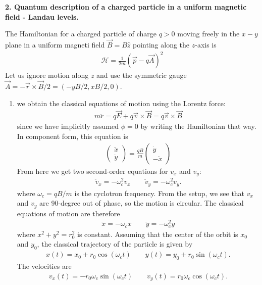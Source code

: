 \documentclass{article}
\theoremstyle{definition}
\newcommand{\ham}{\mathcal{H}}
\newcommand{\f}[2]{\frac{#1}{#2}}
\newcommand{\lp}{\left(}
\newcommand{\rp}{\right)}
\begin{document}
\noindent \textbf{2. Quantum description of a charged particle in a uniform magnetic field - Landau levels.}

\noindent The Hamiltonian for a charged particle of charge $q>0$ moving freely in the $x-y$ plane in a uniform magneti field $\vec{B} = B\hat{z}$ pointing along the $z$-axis is
\begin{align*}
	\ham = \f{1}{2m}\lp \vec{p} - q\vec{A} \rp^2
\end{align*}
Let us ignore motion along $z$ and use the symmetric gauge $\vec{A} = -\vec{r}\times \vec{B}/2 = (-yB/2, xB/2,0)$. 

\begin{enumerate}[label=\alph*)]
	
	\item we obtain the classical equations of motion using the Lorentz force:
	\begin{align*}
		m\ddot{r} = q\vec{E} + q \vec{v}\times \vec{B} = q \vec{v} \times \vec{B}
	\end{align*}
	since we have implicitly assumed $\phi = 0$ by writing the Hamiltonian that way. In component form, this equation is 
	\begin{align*}
		\begin{pmatrix}
			\ddot{x} \\ \ddot{y}
		\end{pmatrix}
	= \f{qB}{m}\begin{pmatrix}
		\dot{y} \\ -\dot{x}  
	\end{pmatrix} 
	\end{align*}
	From here we get two second-order equations for $v_x$ and $v_y$: 
	\begin{align*}
		\ddot{v}_x = -\omega_c^2 v_x \quad\quad \ddot{v}_y = -\omega_c^2 v_y.
	\end{align*}
	where $\omega_c = qB/m$ is the cyclotron frequency. From the setup, we see that $v_x$ and $v_y$ are 90-degree out of phase, so the motion is circular. The classical equations of motion are therefore
	\begin{align*}
		\ddot{x} = -\omega_c x \quad\quad \ddot{y} = -\omega_c^2 y 
	\end{align*}
	where $x^2 + y^2 = r_0^2 $ is constant. Assuming that the center of the orbit is $x_0$ and $y_0$, the classical trajectory of the particle is given by 
	\begin{align*}
		x(t) = x_0 + r_0\cos(\omega_c t ) \quad\quad 
		y(t) = y_0 + r_0\sin(\omega_c t ).
	\end{align*}
	The velocities are
	\begin{align*}
		v_x(t) = -r_0\omega_c \sin(\omega_c t ) \quad\quad 
		v_y(t) = r_0\omega_c \cos(\omega_c t ).
	\end{align*}


\end{enumerate}
\end{document}
